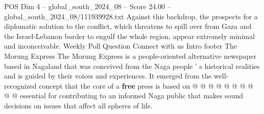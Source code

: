 \begin{textsample}{POS Dim 4 – global\_south\_2024\_08 – Score 24.00 – global\_south\_2024\_08/111939928.txt}
Against this backdrop, the prospects for a diplomatic solution to the conflict, which threatens to spill over from Gaza and the Israel-Lebanon border to engulf the whole region, appear extremely minimal and inconceivable.
Weekly Poll Question Connect with us Intro footer The Morung Express The Morung Express is a people-oriented alternative newspaper based in Nagaland that was conceived from the Naga people ' s historical realities and is guided by their voices and experiences.
It emerged from the well-recognized concept that the core of a \textbf{free} press is based on @ @ @ @ @ @ @ @ @ @ essential for contributing to an informed Naga public that makes sound decisions on issues that affect all spheres of life.

\end{textsample}
